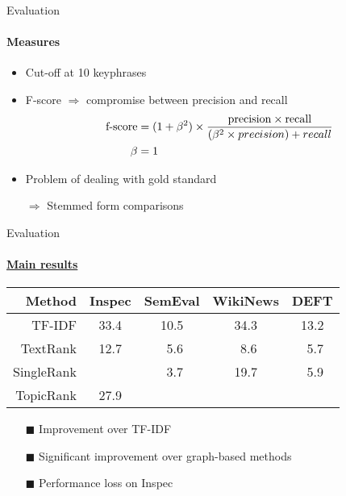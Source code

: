   \begin{frame}{Evaluation}
    \framesubtitle{Measures}

    \begin{itemize}
      \item{Cut-off at 10 keyphrases}
      \item{F-score $\Rightarrow$ compromise between precision and recall}
      \begin{align}
        \text{f-score} &= (1 + \beta^2) \times \frac{\text{precision} \times \text{recall}}{(\beta^2 \times precision) + recall} \notag\\
        \beta &= 1 \notag
      \end{align}
      \item{Problem of dealing with gold standard}
      \item[$\Rightarrow$]{Stemmed form comparisons}
    \end{itemize}
  \end{frame}

  \begin{frame}[label=main_results]{Evaluation}
    \framesubtitle{\hyperlink{main_results_backup}{Main results}}
    
    \begin{center}
      \begin{tabular}{rcccc}
        \toprule
        \textbf{Method} & \textbf{Inspec} & \textbf{SemEval} & \textbf{WikiNews} & \textbf{DEFT}\\
        \midrule
        TF-IDF & 33.4 & 10.5 & 34.3 & 13.2\\
        TextRank & 12.7 & $~~$5.6 & $~~$8.6 & $~~$5.7\\
        SingleRank & \cellcolor{pink}{35.2} & $~~$3.7 & 19.7 & $~~$5.9\\
        TopicRank & 27.9 & \cellcolor{pink}{12.1} & \cellcolor{pink}{35.6} & \cellcolor{pink}{15.1}\\
        \bottomrule
      \end{tabular}
    \end{center}

    \begin{itemize}
      \item[\footnotesize\color{green}$\blacksquare$]{Improvement over TF-IDF}
      \item[\footnotesize\color{green}$\blacksquare$]{Significant improvement
                                                      over graph-based methods}
      \item[\footnotesize\color{red}$\blacksquare$]{Performance loss on Inspec}
    \end{itemize}
  \end{frame}

